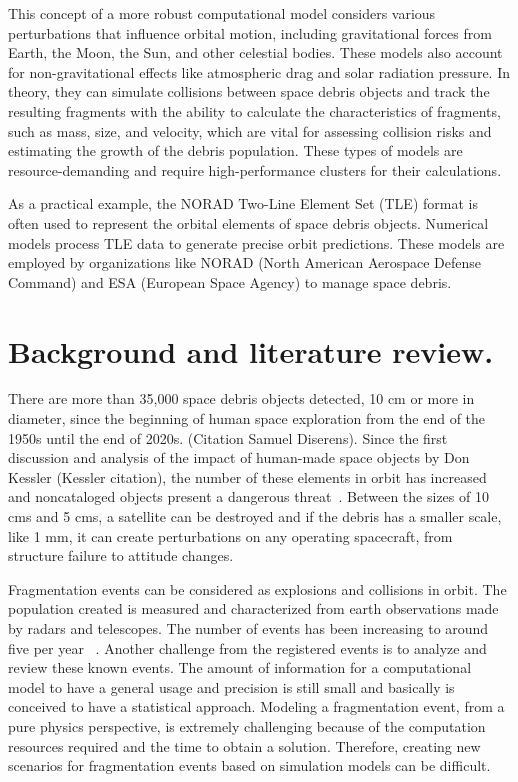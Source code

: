 \documentclass[11pt]{article} %
\begin{document}
This concept of a more robust computational model considers various perturbations that influence orbital motion, including gravitational forces from Earth, the Moon, the Sun, and other celestial bodies. These models also account for non-gravitational effects like atmospheric drag and solar radiation pressure. In theory, they can simulate collisions between space debris objects and track the resulting fragments with the ability to calculate the characteristics of fragments, such as mass, size, and velocity, which are vital for assessing collision risks and estimating the growth of the debris population. These types of models are resource-demanding and require high-performance clusters for their calculations. 

As a practical example, the NORAD Two-Line Element Set (TLE) format is often used to represent the orbital elements of space debris objects. Numerical models process TLE data to generate precise orbit predictions. These models are employed by organizations like NORAD (North American Aerospace Defense Command) and ESA (European Space Agency) to manage space debris.~\cite{vallado_two-line_2012}

\section{Background and literature review.}

There are more than 35,000 space debris objects detected, 10 cm or more in diameter,  since the beginning of human space exploration from the end of the 1950s until the end of 2020s. (Citation Samuel Diserens). Since the first discussion and analysis of the impact of human-made space objects by Don Kessler (Kessler citation), the number of these elements in orbit has increased and noncataloged objects present a dangerous threat~\cite{diserens_newspace_2020,kessler_environment_1985}.  Between the sizes of 10 cms and 5 cms, a satellite can be destroyed and if the debris has a smaller scale, like 1 mm, it can create perturbations on any operating spacecraft, from structure failure to attitude changes.

Fragmentation events can be considered as explosions and collisions in orbit. The population created is measured and characterized from earth observations made by radars and telescopes. The number of events has been increasing to around five per year ~\cite{horstmann_survey_2018}. Another challenge from the registered events is to analyze and review these known events. The amount of information for a computational model to have a general usage and precision is still small and basically is conceived to have a statistical approach. Modeling a fragmentation event, from a pure physics perspective, is extremely challenging because of the computation resources required and the time to obtain a solution. Therefore, creating new scenarios for fragmentation events based on simulation models can be difficult.
\end{document}
